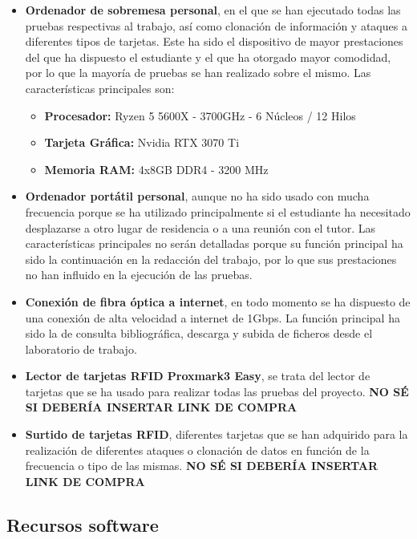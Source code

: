 \begin{itemize}
  \item \textbf{Ordenador de sobremesa personal}, en el que se han ejecutado todas las pruebas respectivas al trabajo,
    así como clonación de información y ataques a diferentes tipos de tarjetas. Este ha sido el dispositivo de mayor 
    prestaciones del que ha dispuesto el estudiante y el que ha otorgado mayor comodidad, por lo que la mayoría de 
    pruebas se han realizado sobre el mismo. Las características principales son:
    \begin{itemize}
        \item \textbf{Procesador: } Ryzen 5 5600X - 3700GHz - 6 Núcleos / 12 Hilos
        \item \textbf{Tarjeta Gráfica: } Nvidia RTX 3070 Ti
        \item \textbf{Memoria RAM: } 4x8GB DDR4 - 3200 MHz
    \end{itemize}
  \item \textbf{Ordenador portátil personal}, aunque no ha sido usado con mucha frecuencia porque se ha utilizado
    principalmente si el estudiante ha necesitado desplazarse a otro lugar de residencia o a una reunión con el tutor.
    Las características principales no serán detalladas porque su función principal ha sido la continuación en la 
    redacción del trabajo, por lo que sus prestaciones no han influido en la ejecución de las pruebas.
  \item \textbf{Conexión de fibra óptica a internet}, en todo momento se ha dispuesto de una conexión de alta velocidad
    a internet de 1Gbps. La función principal ha sido la de consulta bibliográfica, descarga y subida de ficheros desde
    el laboratorio de trabajo.
  \item \textbf{Lector de tarjetas RFID Proxmark3 Easy}, se trata del lector de tarjetas que se ha usado para realizar todas
    las pruebas del proyecto. \textbf{NO SÉ SI DEBERÍA INSERTAR LINK DE COMPRA}
  \item \textbf{Surtido de tarjetas RFID}, diferentes tarjetas que se han adquirido para la realización de 
    diferentes ataques o clonación de datos en función de la frecuencia o tipo de las mismas. 
    \textbf{NO SÉ SI DEBERÍA INSERTAR LINK DE COMPRA}
\end{itemize}

\subsection{Recursos software}


